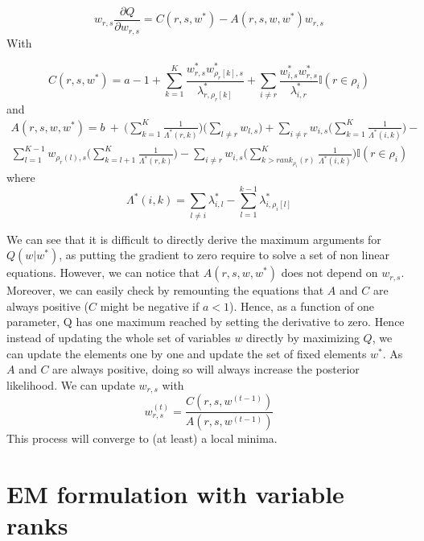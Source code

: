 \documentclass[12pt]{ociamthesis}  %
\begin{document}
	\begin{equation}
	w_{r,s} \frac{\partial Q}{\partial w_{r,s}} = C(r,s,w^{*}) - A(r,s,w,w^{*})w_{r,s}
	\end{equation}
	With
	
	\begin{equation}
	C(r,s,w^{*}) = a - 1 + \sum_{k = 1}^{K}\frac{w^{*}_{r,s}w^{*}_{\rho_{r}[k],s}}{\lambda^{*}_{r,\rho_{r}[k]}} + \sum_{i \neq r} \frac{w^{*}_{i,s}w^{*}_{r,s}}{\lambda^{*}_{i,r}} \mathbb{I}(r \in \rho_{i})
	\end{equation} and
	\begin{multline}
	A(r,s,w,w^{*}) = b \ + \ \bigg( \sum_{k = 1}^{K} \frac{1}{\Lambda^{*}(r,k)} \bigg) \bigg( \sum_{l \neq r} w_{l,s} \bigg) + \sum_{i \neq r} w_{i,s} \bigg( \sum_{k = 1}^{K} \frac{1}{\Lambda^{*}(i,k)} \bigg) - \\ \sum_{l = 1}^{K-1} w_{\rho_{r}(l), s} \bigg( \sum_{k = l+1}^{K} \frac{1}{\Lambda^{*}(r,k)} \bigg) - \sum_{i \neq r} w_{i,s} \bigg( \sum_{k > rank_{\rho_{i}}(r)}^{K} \frac{1}{\Lambda^{*}(i,k)} \bigg)\mathbb{I}(r \in \rho_{i})
	\end{multline} where
	\begin{equation}
	\Lambda^{*}(i,k) = \sum_{l \neq i} \lambda^{*}_{i,l} - \sum_{l = 1}^{k-1} \lambda^{*}_{i,\rho_{i}[l]}
	\end{equation}
	
	We can see that it is difficult to directly derive the maximum arguments for $Q(w|w^{*})$, as putting the gradient to zero require to solve a set of non linear equations. However, we can notice that $A(r,s,w,w^{*})$ does not depend on $w_{r,s}$. Moreover, we can easily check by remounting the equations that $A$ and $C$ are always positive ($C$ might be negative if $a < 1$). Hence, as a function of one parameter, Q has one maximum reached by setting the derivative to zero. Hence instead of updating the whole set of variables $w$ directly by maximizing $Q$, we can update the elements one by one and update the set of fixed elements $w^{*}$. As $A$ and $C$ are always positive, doing so will always increase the posterior likelihood. We can update $w_{r,s}$ with
	\begin{equation}
	w^{(t)}_{r,s} = \frac{C(r,s,w^{(t-1)})}{A(r,s,w^{(t-1)})}
	\end{equation}
	This process will converge to (at least) a local minima.
	\newpage
	
	\section{EM formulation with variable ranks}
	
\end{document}
